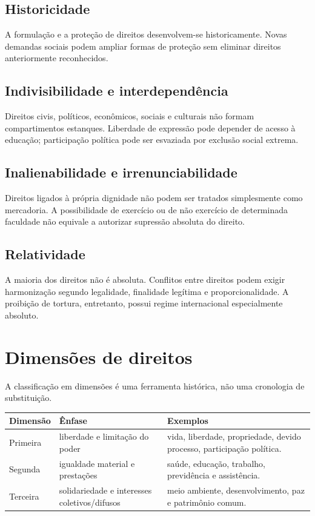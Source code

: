 \subsection{Historicidade}

A formulação e a proteção de direitos desenvolvem-se historicamente. Novas demandas sociais podem ampliar formas de proteção sem eliminar direitos anteriormente reconhecidos.

\subsection{Indivisibilidade e interdependência}

Direitos civis, políticos, econômicos, sociais e culturais não formam compartimentos estanques. Liberdade de expressão pode depender de acesso à educação; participação política pode ser esvaziada por exclusão social extrema.

\subsection{Inalienabilidade e irrenunciabilidade}

Direitos ligados à própria dignidade não podem ser tratados simplesmente como mercadoria. A possibilidade de exercício ou de não exercício de determinada faculdade não equivale a autorizar supressão absoluta do direito.

\subsection{Relatividade}

A maioria dos direitos não é absoluta. Conflitos entre direitos podem exigir harmonização segundo legalidade, finalidade legítima e proporcionalidade. A proibição de tortura, entretanto, possui regime internacional especialmente absoluto.

\section{Dimensões de direitos}

A classificação em dimensões é uma ferramenta histórica, não uma cronologia de substituição.

\begin{table}[ht]
\centering
\small
\begin{tabularx}{\textwidth}{l X X}
\toprule
Dimensão & Ênfase & Exemplos \\
\midrule
Primeira & liberdade e limitação do poder & vida, liberdade, propriedade, devido processo, participação política. \\
Segunda & igualdade material e prestações & saúde, educação, trabalho, previdência e assistência. \\
Terceira & solidariedade e interesses coletivos/difusos & meio ambiente, desenvolvimento, paz e patrimônio comum. \\
\bottomrule
\end{tabularx}
\end{table}

